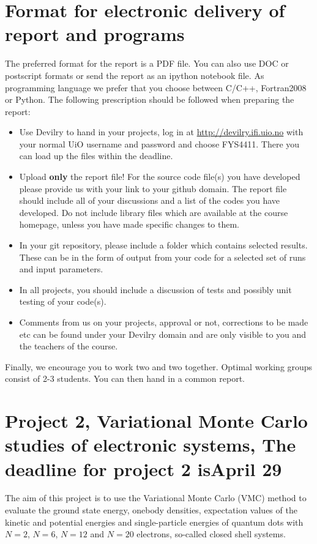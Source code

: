 \documentclass[10pt]{article}
\begin{document}
\section*{Format for electronic delivery of report and programs}
%
The preferred format for the report is a PDF file. You can also
use DOC or postscript formats or send the report as an ipython notebook file. 
As programming language we prefer that you choose between C/C++, Fortran2008 or Python.
The following prescription should be followed when preparing the report:
\begin{itemize}
\item Use Devilry to hand in your projects, log in  at \url{http://devilry.ifi.uio.no} with your normal UiO username and password
and choose FYS4411.
There you can load up the files within the deadline.
\item Upload {\bf only} the report file!  For the source code file(s) you have developed please provide us with your link to your github domain. 
The report file should include all of your discussions and a list of the codes you have developed. 
Do not include library files which are available at the course homepage, unless you have
made specific changes to them.
\item In your git repository, please include a folder which contains selected results. These can be in the form of output from your code
for a selected set of runs and input parameters. 
\item In all projects, you should include a discussion of tests and possibly unit testing of your code(s).
\item Comments  from us on your projects, approval or not, corrections to be made 
etc can be found under
your Devilry domain and are only visible to you and the teachers of the course.

\end{itemize}

Finally, 
we encourage you to work two and two together. Optimal working groups consist of 
2-3 students. You can then hand in a common report. 


\section*{Project 2, Variational Monte Carlo studies of electronic systems, The deadline for project 2 isApril 29 }

The aim of this project is to use the Variational Monte
Carlo (VMC) method to evaluate 
the ground state energy, onebody densities, expectation values of the kinetic and potential energies 
 and single-particle energies of 
quantum dots with $N=2$, $N=6$, $N=12$ and $N=20$ electrons, so-called closed shell systems.
\end{document}
